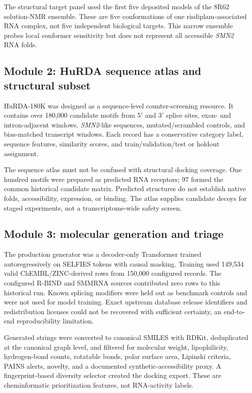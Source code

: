 \documentclass[journal]{IEEEtran}
\begin{document}
The structural target panel used the first five deposited models of the
8R62 solution-NMR ensemble. These are five conformations of one
risdiplam-associated RNA complex, not five independent biological
targets. This narrow ensemble probes local conformer sensitivity but
does not represent all accessible \textit{SMN2} RNA folds.

\subsection{Module 2: HuRDA sequence atlas and structural subset}

HuRDA-180K was designed as a sequence-level counter-screening resource.
It contains over 180,000 candidate motifs from 5$'$ and 3$'$ splice
sites, exon- and intron-adjacent windows, \textit{SMN2}-like sequences,
mutated/scrambled controls, and bias-matched transcript windows. Each
record has a conservative category label, sequence features, similarity
scores, and train/validation/test or holdout assignment.

The sequence atlas must not be confused with structural docking
coverage. One hundred motifs were prepared as predicted RNA receptors;
97 formed the common historical candidate matrix. Predicted structures
do not establish native folds, accessibility, expression, or binding.
The atlas supplies candidate decoys for staged experiments, not a
transcriptome-wide safety screen.

\subsection{Module 3: molecular generation and triage}

The production generator was a decoder-only Transformer trained
autoregressively on SELFIES tokens with causal masking. Training used
149,534 valid ChEMBL/ZINC-derived rows from 150,000 configured records.
The configured R-BIND and SMMRNA sources contributed zero rows to this
historical run. Known splicing modifiers were held out as benchmark
controls and were not used for model training. Exact upstream database
release identifiers and redistribution licenses could not be recovered
with sufficient certainty, an end-to-end reproducibility limitation.

Generated strings were converted to canonical SMILES with RDKit,
deduplicated at the canonical graph level, and filtered for molecular
weight, lipophilicity, hydrogen-bond counts, rotatable bonds, polar
surface area, Lipinski criteria, PAINS alerts, novelty, and a documented
synthetic-accessibility proxy. A fingerprint-based diversity selector
created the docking export. These are cheminformatic prioritization
features, not RNA-activity labels.
\end{document}

